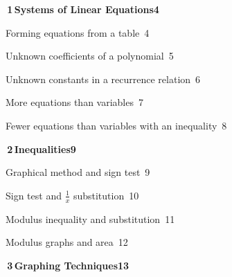 \documentclass[a4paper,openany]{book}
\begin{document}
{\small\linespread{0.92}\selectfont
\medskip\noindent\colorbox{blue!8}{\parbox{\dimexpr\textwidth-2\fboxsep}{\large\bfseries\color{blue!50!black}\colorbox{blue!50!black}{\color{white}\,1\,}\quad Systems of Linear Equations\hfill 4}}\par\nopagebreak\smallskip\nopagebreak
\noindent{}\quad Forming equations from a table\dotfill\ 4\par
\noindent{}\quad Unknown coefficients of a polynomial\dotfill\ 5\par
\noindent{}\quad Unknown constants in a recurrence relation\dotfill\ 6\par
\noindent{}\quad More equations than variables\dotfill\ 7\par
\noindent{}\quad Fewer equations than variables with an inequality\dotfill\ 8\par
\medskip\noindent\colorbox{blue!8}{\parbox{\dimexpr\textwidth-2\fboxsep}{\large\bfseries\color{blue!50!black}\colorbox{blue!50!black}{\color{white}\,2\,}\quad Inequalities\hfill 9}}\par\nopagebreak\smallskip\nopagebreak
\noindent{}\quad Graphical method and sign test\dotfill\ 9\par
\noindent{}\quad Sign test and $\frac 1x$ substitution\dotfill\ 10\par
\noindent{}\quad Modulus inequality and substitution\dotfill\ 11\par
\noindent{}\quad Modulus graphs and area\dotfill\ 12\par
\medskip\noindent\colorbox{blue!8}{\parbox{\dimexpr\textwidth-2\fboxsep}{\large\bfseries\color{blue!50!black}\colorbox{blue!50!black}{\color{white}\,3\,}\quad Graphing Techniques\hfill 13}}\par\nopagebreak\smallskip\nopagebreak
}
\end{document}
